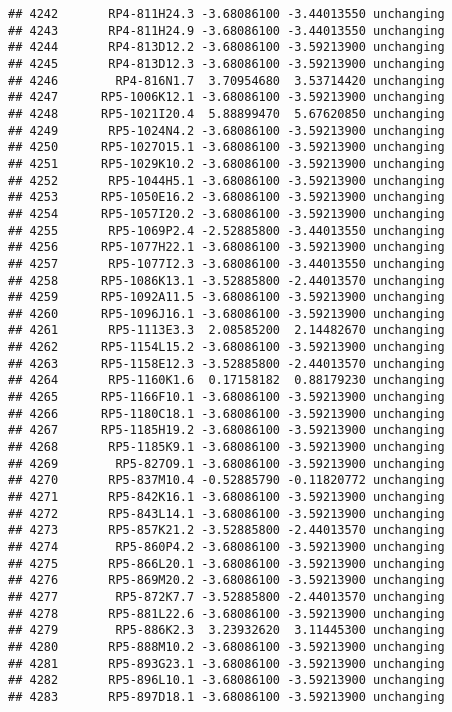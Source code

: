 \documentclass[]{article}
\begin{document}
\begin{verbatim}
## 4242       RP4-811H24.3 -3.68086100 -3.44013550 unchanging
## 4243       RP4-811H24.9 -3.68086100 -3.44013550 unchanging
## 4244       RP4-813D12.2 -3.68086100 -3.59213900 unchanging
## 4245       RP4-813D12.3 -3.68086100 -3.59213900 unchanging
## 4246        RP4-816N1.7  3.70954680  3.53714420 unchanging
## 4247      RP5-1006K12.1 -3.68086100 -3.59213900 unchanging
## 4248      RP5-1021I20.4  5.88899470  5.67620850 unchanging
## 4249       RP5-1024N4.2 -3.68086100 -3.59213900 unchanging
## 4250      RP5-1027O15.1 -3.68086100 -3.59213900 unchanging
## 4251      RP5-1029K10.2 -3.68086100 -3.59213900 unchanging
## 4252       RP5-1044H5.1 -3.68086100 -3.59213900 unchanging
## 4253      RP5-1050E16.2 -3.68086100 -3.59213900 unchanging
## 4254      RP5-1057I20.2 -3.68086100 -3.59213900 unchanging
## 4255       RP5-1069P2.4 -2.52885800 -3.44013550 unchanging
## 4256      RP5-1077H22.1 -3.68086100 -3.59213900 unchanging
## 4257       RP5-1077I2.3 -3.68086100 -3.44013550 unchanging
## 4258      RP5-1086K13.1 -3.52885800 -2.44013570 unchanging
## 4259      RP5-1092A11.5 -3.68086100 -3.59213900 unchanging
## 4260      RP5-1096J16.1 -3.68086100 -3.59213900 unchanging
## 4261       RP5-1113E3.3  2.08585200  2.14482670 unchanging
## 4262      RP5-1154L15.2 -3.68086100 -3.59213900 unchanging
## 4263      RP5-1158E12.3 -3.52885800 -2.44013570 unchanging
## 4264       RP5-1160K1.6  0.17158182  0.88179230 unchanging
## 4265      RP5-1166F10.1 -3.68086100 -3.59213900 unchanging
## 4266      RP5-1180C18.1 -3.68086100 -3.59213900 unchanging
## 4267      RP5-1185H19.2 -3.68086100 -3.59213900 unchanging
## 4268       RP5-1185K9.1 -3.68086100 -3.59213900 unchanging
## 4269        RP5-827O9.1 -3.68086100 -3.59213900 unchanging
## 4270       RP5-837M10.4 -0.52885790 -0.11820772 unchanging
## 4271       RP5-842K16.1 -3.68086100 -3.59213900 unchanging
## 4272       RP5-843L14.1 -3.68086100 -3.59213900 unchanging
## 4273       RP5-857K21.2 -3.52885800 -2.44013570 unchanging
## 4274        RP5-860P4.2 -3.68086100 -3.59213900 unchanging
## 4275       RP5-866L20.1 -3.68086100 -3.59213900 unchanging
## 4276       RP5-869M20.2 -3.68086100 -3.59213900 unchanging
## 4277        RP5-872K7.7 -3.52885800 -2.44013570 unchanging
## 4278       RP5-881L22.6 -3.68086100 -3.59213900 unchanging
## 4279        RP5-886K2.3  3.23932620  3.11445300 unchanging
## 4280       RP5-888M10.2 -3.68086100 -3.59213900 unchanging
## 4281       RP5-893G23.1 -3.68086100 -3.59213900 unchanging
## 4282       RP5-896L10.1 -3.68086100 -3.59213900 unchanging
## 4283       RP5-897D18.1 -3.68086100 -3.59213900 unchanging

\end{verbatim}
\end{document}
